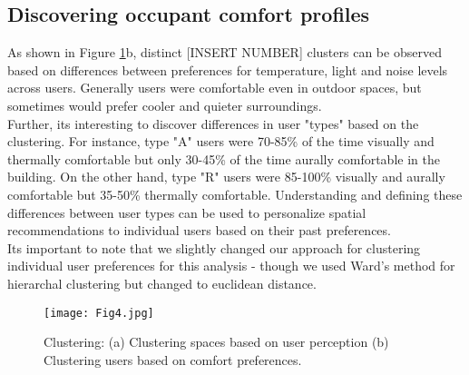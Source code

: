 \subsection{Discovering occupant comfort profiles}
 
As shown in Figure \ref{fig:clustering}b, distinct [INSERT NUMBER] clusters can be observed based on differences between preferences for temperature, light and noise levels across users. Generally users were comfortable even in outdoor spaces, but sometimes would prefer cooler and quieter surroundings.\\

Further, its interesting to discover differences in user "types" based on the clustering. For instance, type "A" users were 70-85\% of the time visually and thermally comfortable but only 30-45\% of the time aurally comfortable in the building. On the other hand, type "R" users were 85-100\% visually and aurally comfortable but 35-50\% thermally comfortable. Understanding and defining these differences between user types can be used to personalize spatial recommendations to individual users based on their past preferences.\\       

Its important to note that we slightly changed our approach for clustering individual user preferences for this analysis - though we used Ward's method for hierarchal clustering but changed to euclidean distance.\\   


\begin{figure}
\begin{center}
\texttt{[image: Fig4.jpg]}
\caption{Clustering: (a) Clustering spaces based on user perception (b) Clustering users based on comfort preferences.}
\label{fig:clustering}
\end{center}
\end{figure}


